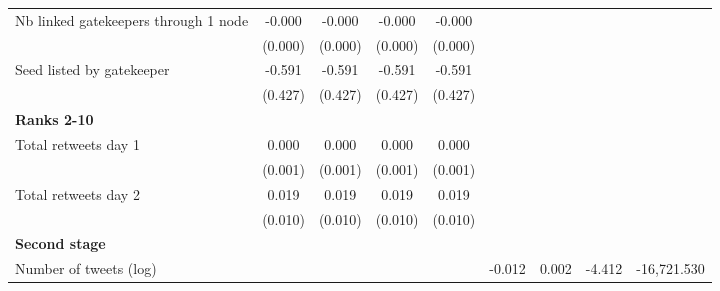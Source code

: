 {\begin{tabular}{l*{8}{c}}
Nb linked gatekeepers through 1 node&      -0.000         &      -0.000         &      -0.000         &      -0.000         &                     &                     &                     &                     \\
                    &     (0.000)         &     (0.000)         &     (0.000)         &     (0.000)         &                     &                     &                     &                     \\
Seed listed by gatekeeper&      -0.591         &      -0.591         &      -0.591         &      -0.591         &                     &                     &                     &                     \\
                    &     (0.427)         &     (0.427)         &     (0.427)         &     (0.427)         &                     &                     &                     &                     \\
\textbf{Ranks 2-10} &                     &                     &                     &                     &                     &                     &                     &                     \\
Total retweets day 1&       0.000         &       0.000         &       0.000         &       0.000         &                     &                     &                     &                     \\
                    &     (0.001)         &     (0.001)         &     (0.001)         &     (0.001)         &                     &                     &                     &                     \\
Total retweets day 2&       0.019\sym{*}  &       0.019\sym{*}  &       0.019\sym{*}  &       0.019\sym{*}  &                     &                     &                     &                     \\
                    &     (0.010)         &     (0.010)         &     (0.010)         &     (0.010)         &                     &                     &                     &                     \\
\textbf{Second stage}&                     &                     &                     &                     &                     &                     &                     &                     \\
Number of tweets (log)&                     &                     &                     &                     &      -0.012         &       0.002         &      -4.412         & -16,721.530         \\

\end{tabular}}
